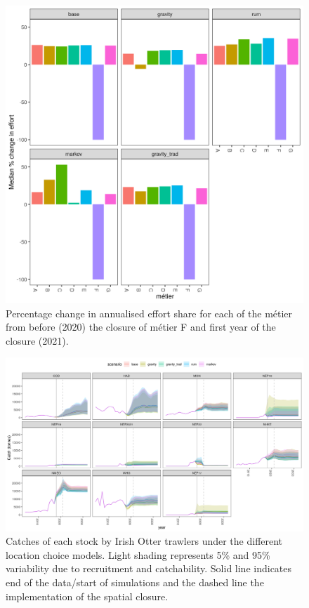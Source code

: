 \documentclass[12pt, halfline, a4paper]{ouparticle}
\begin{document}
\begin{figure}[!ht]
	\centering
	\includegraphics[width=1\linewidth]{figures/Change_effort}
	\caption{Percentage change in annualised effort share for each of the
		métier from before (2020) the closure of métier F and first
		year of the closure (2021).} 
	\label{fig:effort_chg}
\end{figure}	

\begin{figure}[!ht]
	\centering
	\includegraphics[width=1\linewidth]{figures/IE_Otter_catches}
	\caption{Catches of each stock by Irish Otter trawlers under the
		different location choice models. Light shading represents 5\%
		and 95\% variability due to recruitment and catchability. Solid
		line indicates end of the data/start of simulations and the
		dashed line the implementation of the spatial closure.} 
	\label{fig:OtterC}
\end{figure}	
\end{document}
